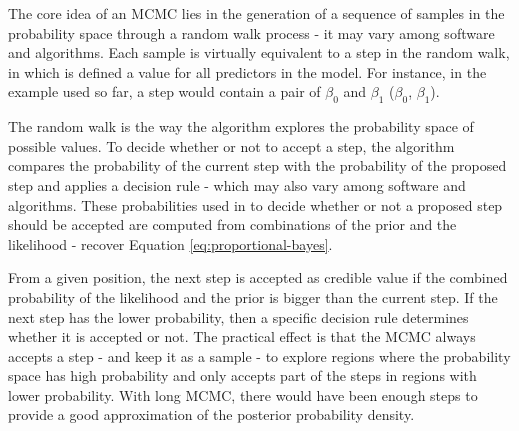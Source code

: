 The core idea of an MCMC lies in the generation of a sequence of samples in the probability space through a random walk process - it may vary among software and algorithms. Each sample is virtually equivalent to a step in the random walk, in which is defined a value for all predictors in the model. For instance, in the example used so far, a step would contain a pair of $\beta_0$ and $\beta_1$ ($\beta_0$, $\beta_1$). 

The random walk is the way the algorithm explores the probability space of possible values. To decide whether or not to accept a step, the algorithm compares the probability of the current step with the probability of the proposed step and applies a decision rule - which may also vary among software and algorithms. These probabilities used in to decide whether or not a proposed step should be accepted are computed from combinations of the prior and the likelihood - recover Equation \ref{eq:proportional-bayes}.

From a given position, the next step is accepted as credible value if the combined probability of the likelihood and the prior is bigger than the current step. If the next step has the lower probability, then a specific decision rule determines whether it is accepted or not. The practical effect is that the MCMC always accepts a step - and keep it as a sample - to explore regions where the probability space has high probability and only accepts part of the steps in regions with lower probability. With long MCMC, there would have been enough steps to provide a good approximation of the posterior probability density. 
